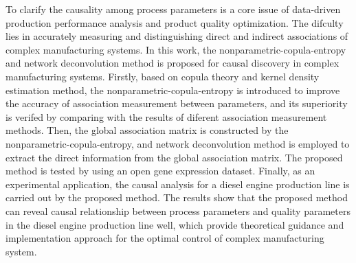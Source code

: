 \cite{Nonparametric-copula-entropy-and-network-deconvolution-method-for-causal-discovery-in-complex-manufacturing-systems}
To clarify the causality among process parameters is a core issue of data-driven production performance analysis and product
quality optimization. The difculty lies in accurately measuring and distinguishing direct and indirect associations of complex
manufacturing systems. In this work, the nonparametric-copula-entropy and network deconvolution method is proposed for
causal discovery in complex manufacturing systems. Firstly, based on copula theory and kernel density estimation method,
the nonparametric-copula-entropy is introduced to improve the accuracy of association measurement between parameters,
and its superiority is verifed by comparing with the results of diferent association measurement methods. Then, the global
association matrix is constructed by the nonparametric-copula-entropy, and network deconvolution method is employed
to extract the direct information from the global association matrix. The proposed method is tested by using an open gene
expression dataset. Finally, as an experimental application, the causal analysis for a diesel engine production line is carried
out by the proposed method. The results show that the proposed method can reveal causal relationship between process
parameters and quality parameters in the diesel engine production line well, which provide theoretical guidance and implementation approach for the optimal control of complex manufacturing system.